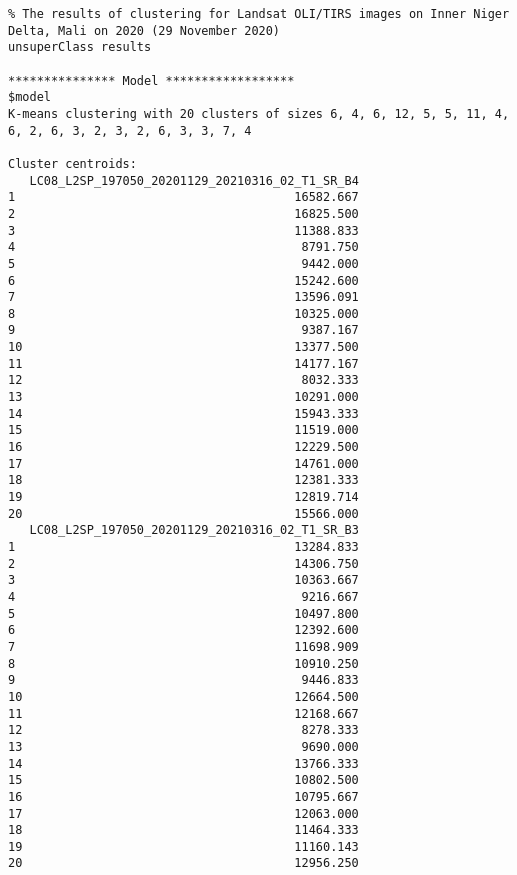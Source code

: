 \begin{scriptsize}
\begin{verbatim}
% The results of clustering for Landsat OLI/TIRS images on Inner Niger Delta, Mali on 2020 (29 November 2020)
unsuperClass results

*************** Model ******************
$model
K-means clustering with 20 clusters of sizes 6, 4, 6, 12, 5, 5, 11, 4, 6, 2, 6, 3, 2, 3, 2, 6, 3, 3, 7, 4

Cluster centroids:
   LC08_L2SP_197050_20201129_20210316_02_T1_SR_B4
1                                       16582.667
2                                       16825.500
3                                       11388.833
4                                        8791.750
5                                        9442.000
6                                       15242.600
7                                       13596.091
8                                       10325.000
9                                        9387.167
10                                      13377.500
11                                      14177.167
12                                       8032.333
13                                      10291.000
14                                      15943.333
15                                      11519.000
16                                      12229.500
17                                      14761.000
18                                      12381.333
19                                      12819.714
20                                      15566.000
   LC08_L2SP_197050_20201129_20210316_02_T1_SR_B3
1                                       13284.833
2                                       14306.750
3                                       10363.667
4                                        9216.667
5                                       10497.800
6                                       12392.600
7                                       11698.909
8                                       10910.250
9                                        9446.833
10                                      12664.500
11                                      12168.667
12                                       8278.333
13                                       9690.000
14                                      13766.333
15                                      10802.500
16                                      10795.667
17                                      12063.000
18                                      11464.333
19                                      11160.143
20                                      12956.250

\end{verbatim}
\end{scriptsize}
